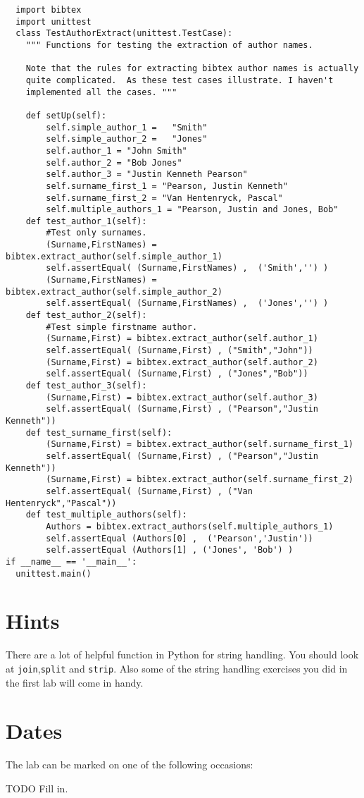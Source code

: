 \documentclass[10pt]{paper}
\begin{document}
\begin{lstlisting}
  import bibtex
  import unittest
  class TestAuthorExtract(unittest.TestCase):
    """ Functions for testing the extraction of author names.

    Note that the rules for extracting bibtex author names is actually
    quite complicated.  As these test cases illustrate. I haven't
    implemented all the cases. """

    def setUp(self):
        self.simple_author_1 =   "Smith"
        self.simple_author_2 =   "Jones"
        self.author_1 = "John Smith"
        self.author_2 = "Bob Jones"
        self.author_3 = "Justin Kenneth Pearson"
        self.surname_first_1 = "Pearson, Justin Kenneth"
        self.surname_first_2 = "Van Hentenryck, Pascal"
        self.multiple_authors_1 = "Pearson, Justin and Jones, Bob"
    def test_author_1(self):
        #Test only surnames.
        (Surname,FirstNames) = bibtex.extract_author(self.simple_author_1)
        self.assertEqual( (Surname,FirstNames) ,  ('Smith','') )
        (Surname,FirstNames) = bibtex.extract_author(self.simple_author_2)
        self.assertEqual( (Surname,FirstNames) ,  ('Jones','') )
    def test_author_2(self):
        #Test simple firstname author.
        (Surname,First) = bibtex.extract_author(self.author_1)
        self.assertEqual( (Surname,First) , ("Smith","John"))
        (Surname,First) = bibtex.extract_author(self.author_2)
        self.assertEqual( (Surname,First) , ("Jones","Bob"))
    def test_author_3(self):
        (Surname,First) = bibtex.extract_author(self.author_3)
        self.assertEqual( (Surname,First) , ("Pearson","Justin Kenneth"))
    def test_surname_first(self):
        (Surname,First) = bibtex.extract_author(self.surname_first_1)
        self.assertEqual( (Surname,First) , ("Pearson","Justin Kenneth"))
        (Surname,First) = bibtex.extract_author(self.surname_first_2)
        self.assertEqual( (Surname,First) , ("Van Hentenryck","Pascal"))
    def test_multiple_authors(self):
        Authors = bibtex.extract_authors(self.multiple_authors_1)
        self.assertEqual (Authors[0] ,  ('Pearson','Justin'))
        self.assertEqual (Authors[1] , ('Jones', 'Bob') )
if __name__ == '__main__':
  unittest.main()
\end{lstlisting}


\section*{Hints}
There are a lot of helpful function in Python for string handling. You
should look at {\tt join},{\tt split} and {\tt strip}. Also some of
the string handling exercises you did in the first lab will come in handy. 


\section*{Dates}
The lab can be marked on one of the following  occasions:

TODO Fill in.
\end{document}
